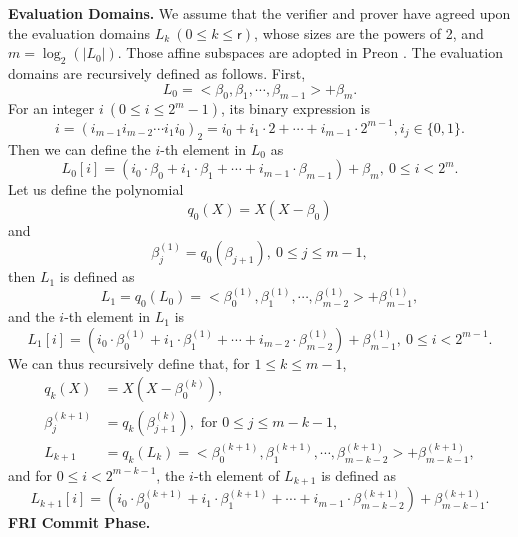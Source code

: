 \noindent\textbf{Evaluation Domains.} We assume that the verifier and prover have agreed upon the evaluation domains $L_k\ (0\le k \le \mathsf{r})$, whose sizes are the powers of 2,  and $m = \log_2(|L_0|)$. Those affine subspaces are adopted in Preon \cite{chen2023preon}.  The evaluation domains are recursively defined as follows. First,
\begin{equation}
	L_0 = <\beta_{0},\beta_{1},\cdots, \beta_{m-1}> + \beta_{m}.
\end{equation}
For an integer $i\ (0\le i \le 2^{m} - 1)$, its binary expression is 
\[i = (i_{m-1}i_{m-2}\cdots i_1i_0)_2 = i_0 + i_1\cdot 2 + \cdots + i_{m-1}\cdot 2^{m-1}, i_j \in \{0,1\}.\]
Then we can define the $i$-th element in $L_0$ as
\begin{equation}
	L_0[i] = (i_0\cdot\beta_0 + i_1\cdot\beta_1+ \cdots + i_{m-1}\cdot\beta_{m-1}) + \beta_{m},\ 0\le i < 2^m.
\end{equation}
Let us define the polynomial
\begin{equation}
	q_0(X) = X(X - \beta_0)
\end{equation}
and \[\beta_j^{(1)} = q_{0}(\beta_{j+1}),\ 0\le j \le m-1,\]
then $L_1$ is defined as
\begin{equation}
	L_1 = q_0(L_0) = <\beta_0^{(1)}, \beta_1^{(1)}, \cdots, \beta_{m-2}^{(1)} > + \beta_{m-1}^{(1)},
\end{equation}
and the $i$-th element in $L_1$ is 
\[L_1[i] =(i_0\cdot\beta_0^{(1)} + i_1\cdot\beta_1^{(1)}+ \cdots + i_{m-2 }\cdot\beta_{m-2}^{(1)}) + \beta_{m-1}^{(1)},\ 0\le i < 2^{m-1}. \]
We can thus recursively define that, { for } $1\le k \le m-1$, 
\begin{equation}
	\begin{aligned}
		q_k(X) &= X(X - \beta_0^{(k)}),\\
		\beta_j^{(k+1)} &= q_{k}(\beta_{j+1}^{(k)}), \text{ for } 0\le j \le m-k-1,\\
		L_{k+1} &= q_k(L_k) = <\beta_0^{(k+1)}, \beta_1^{(k+1)}, \cdots, \beta_{m-k-2}^{(k+1)} > + \beta_{m-k-1}^{(k+1)},
	\end{aligned}
\end{equation}
and for $ 0\le i < 2^{m-k-1}$, the $i$-th element of $L_{k+1}$ is defined as
\begin{equation*}
	L_{k+1}[i] =(i_0\cdot\beta_0^{(k+1)} + i_1\cdot\beta_1^{(k+1)}+ \cdots + i_{m-1}\cdot\beta_{m-k-2}^{(k+1)}) + \beta_{m-k-1}^{(k+1)}. 
\end{equation*}
\newline
\noindent\textbf{FRI Commit Phase.}

